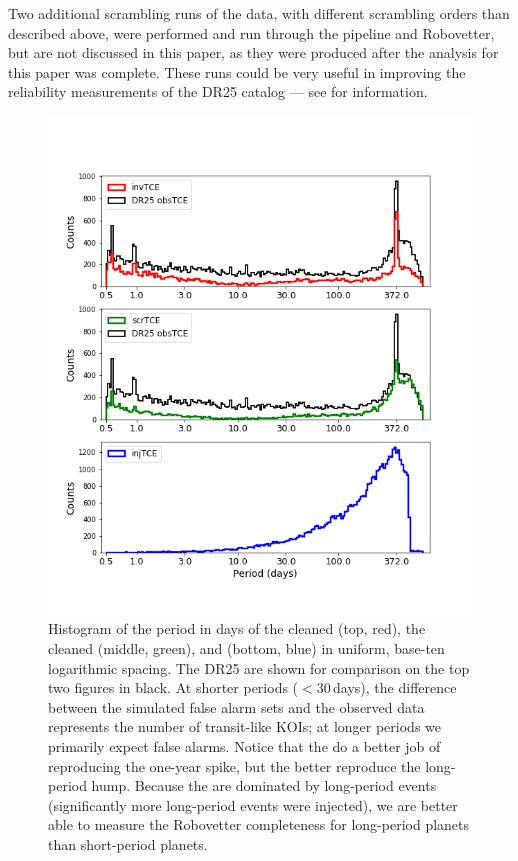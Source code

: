 Two additional scrambling runs of the data, with different scrambling orders than described above, were performed and run through the \Kepler{} pipeline and Robovetter, but are not discussed in this paper, as they were produced after the analysis for this paper was complete. These runs could be very useful in improving the reliability measurements of the DR25 catalog --- see \citealt{Coughlin2017a} for information.


\begin{figure}[htbp]
 \begin{center}
  \includegraphics[width=\linewidth]{fig-simulTcePeriods.png}
  \caption{Histogram of the period in days of the cleaned  (top, red), the cleaned  (middle, green), and  (bottom, blue) in uniform, base-ten logarithmic spacing. The DR25  are shown for comparison on the top two figures in black.  At shorter periods ($< 30$\,days), the difference between the simulated false alarm sets and the observed data represents the number of transit-like KOIs; at longer periods we primarily expect false alarms. Notice that the  do a better job of reproducing the one-year spike, but the  better reproduce the long-period hump. Because the  are dominated by long-period events (significantly more long-period events were injected), we are better able to measure the Robovetter completeness for long-period planets than short-period planets.}
  \label{f:simtces} 
 \end{center}
 \end{figure}



